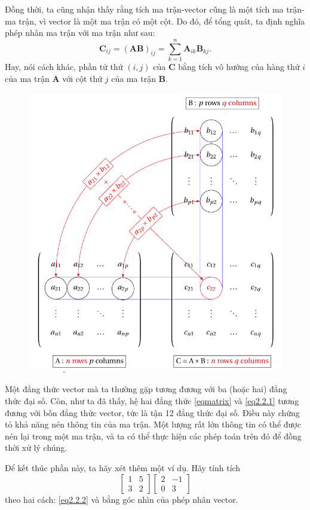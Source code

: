 Đồng thời, ta cũng nhận thấy rằng tích ma trận-vector cũng là một tích ma trận-ma trận, vì vector là một ma trận có một cột. Do đó, để tổng quát, ta định nghĩa phép nhân ma trận với ma trận như sau: 
\begin{equation}\label{eq2.2.2}
    \mathbf{C}_{ij}=(\mathbf{AB})_{ij}=\sum_{k=1}^n \mathbf{A}_{ik}\mathbf{B}_{kj}.
\end{equation}
Hay, nói cách khác, phần tử thứ \((i,j)\) của \(\mathbf{C}\) bằng tích vô hướng của hàng thứ \(i\) của ma trận \(\mathbf{A}\) với cột thứ \(j\) của ma trận \(\mathbf{B}\).
\begin{figure}[H]
    \centering
    \includegraphics[width=0.5\linewidth]{Tuan2/Figures/matricemultiplication.png}
\end{figure}
Một đẳng thức vector mà ta thường gặp tương đương với ba (hoặc hai) đẳng thức đại số. Còn, như ta đã thấy, hệ hai đẳng thức \eqref{eqmatrix} và \eqref{eq2.2.1} tương đương với bốn đẳng thức vector, tức là tận 12 đẳng thức đại số. Điều này chứng tỏ khả năng nén thông tin của ma trận. Một lượng rất lớn thông tin có thể được nén lại trong một ma trận, và ta có thể thực hiện các phép toán trên đó để đồng thời xử lý chúng. 
\vspace{8pt}

Để kết thúc phần này, ta hãy xét thêm một ví dụ. Hãy tính tích
\[\begin{bmatrix}
    1&5\\ 3&2
\end{bmatrix}\begin{bmatrix}
    2&-1\\ 0&3
\end{bmatrix}\] theo hai cách: \eqref{eq2.2.2} và bằng góc nhìn của phép nhân vector.

